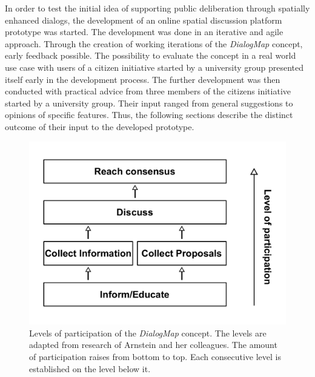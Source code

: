 In order to test the initial idea of supporting public deliberation through spatially enhanced dialogs, the development of an online spatial discussion platform prototype was started. The development was done in an iterative and agile approach. Through the creation of working iterations of the \textit{DialogMap} concept, early feedback possible. The possibility to evaluate the concept in a real world use case with users of a citizen initiative started by a university group presented itself early in the development process. The further development was then conducted with practical advice from three members of the citizens initiative started by a university group. Their input ranged from general suggestions to opinions of specific features. Thus, the following sections describe the distinct outcome of their input to the developed prototype.

\begin{figure}[!h]
    \centering
    \includegraphics[width=1\columnwidth]{images/my_ladder}
    \caption{Levels of participation of the \textit{DialogMap} concept. The levels are adapted from research of Arnstein and her colleagues. The amount of participation raises from bottom to top. Each consecutive level is established on the level below it.}
    \label{fig:my_ladder}
\end{figure}


